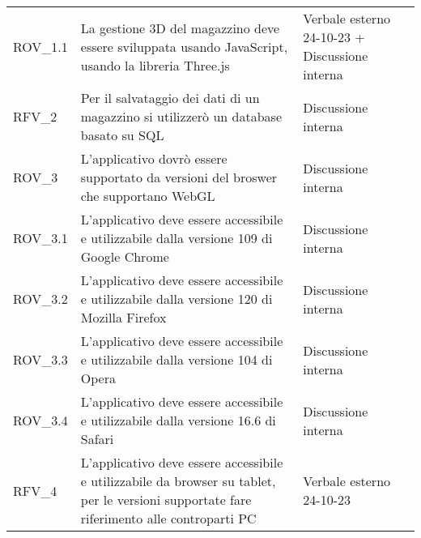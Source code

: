 \begin{xltabular}{\textwidth}{ p{0.2\textwidth} | X | p{0.2\textwidth} }
    ROV\_1.1& La gestione 3D del magazzino deve essere sviluppata usando JavaScript, usando la libreria Three.js & Verbale esterno 24-10-23 + Discussione interna \\
    RFV\_2& Per il salvataggio dei dati di un magazzino si utilizzerò un database basato su SQL & Discussione interna\\
    ROV\_3& L'applicativo dovrò essere supportato da versioni del broswer che supportano WebGL & Discussione interna\\
    ROV\_3.1& L'applicativo deve essere accessibile e utilizzabile dalla versione 109 di Google Chrome & Discussione interna\\
    ROV\_3.2& L'applicativo deve essere accessibile e utilizzabile dalla versione 120 di Mozilla Firefox & Discussione interna\\
    ROV\_3.3& L'applicativo deve essere accessibile e utilizzabile dalla versione 104 di Opera & Discussione interna\\
    ROV\_3.4& L'applicativo deve essere accessibile e utilizzabile dalla versione 16.6 di Safari & Discussione interna\\
    RFV\_4& L'applicativo deve essere accessibile e utilizzabile da browser su tablet, per le versioni supportate fare riferimento alle controparti PC & Verbale esterno 24-10-23\\

    \hline
\end{xltabular}


\renewcommand{\arraystretch}{1.25}
